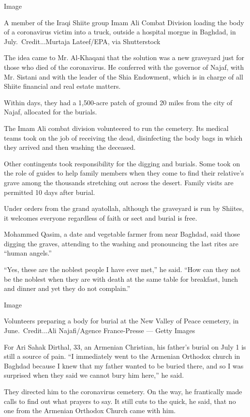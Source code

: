 Image

A member of the Iraqi Shiite group Imam Ali Combat Division loading the
body of a coronavirus victim into a truck, outside a hospital morgue in
Baghdad, in July.~Credit...Murtaja Lateef/EPA, via Shutterstock

The idea came to Mr. Al-Khaqani that the solution was a new graveyard
just for those who died of the coronavirus. He conferred with the
governor of Najaf, with Mr. Sistani and with the leader of the Shia
Endowment, which is in charge of all Shiite financial and real estate
matters.

Within days, they had a 1,500-acre patch of ground 20 miles from the
city of Najaf, allocated for the burials.

The Imam Ali combat division volunteered to run the cemetery. Its
medical teams took on the job of receiving the dead, disinfecting the
body bags in which they arrived and then washing the deceased.

Other contingents took responsibility for the digging and burials. Some
took on the role of guides to help family members when they come to find
their relative's grave among the thousands stretching out across the
desert. Family visits are permitted 10 days after burial.

Under orders from the grand ayatollah, although the graveyard is run by
Shiites, it welcomes everyone regardless of faith or sect and burial is
free.

Mohammed Qasim, a date and vegetable farmer from near Baghdad, said
those digging the graves, attending to the washing and pronouncing the
last rites are ``human angels.''

``Yes, these are the noblest people I have ever met,'' he said. ``How
can they not be the noblest when they are with death at the same table
for breakfast, lunch and dinner and yet they do not complain.''

Image

Volunteers preparing a body for burial at the New Valley of Peace
cemetery, in June.~Credit...Ali Najafi/Agence France-Presse --- Getty
Images

For Ari Sahak Dirthal, 33, an Armenian Christian, his father's burial on
July 1 is still a source of pain. ``I immediately went to the Armenian
Orthodox church in Baghdad because I knew that my father wanted to be
buried there, and so I was surprised when they said we cannot bury him
here,'' he said.

They directed him to the coronavirus cemetery. On the way, he
frantically made calls to find out what prayers to say. It still cuts to
the quick, he said, that no one from the Armenian Orthodox Church came
with him.

